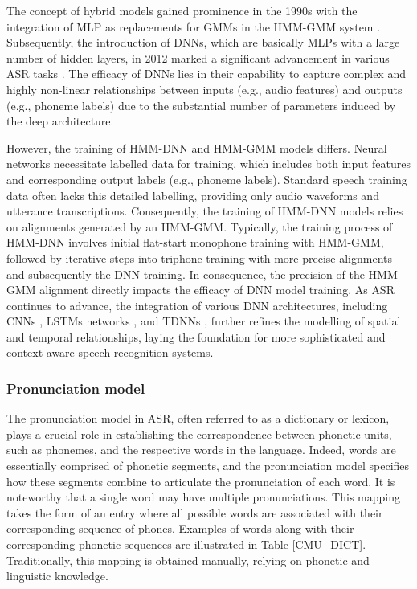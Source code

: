 The concept of hybrid models gained prominence in the 1990s with the integration of \ac{MLP} as replacements for \acp{GMM} in the \ac{HMM-GMM} system \cite{bourlard2012connectionist,meinedo2003audimus}. Subsequently, the introduction of \acp{DNN}, which are basically \acp{MLP} with a large number of hidden layers, in 2012 marked a significant advancement in various \ac{ASR} tasks \cite{hmm-dnn}. The efficacy of \acp{DNN} lies in their capability to capture complex and highly non-linear relationships between inputs (e.g., audio features) and outputs (e.g., phoneme labels) due to the substantial number of parameters induced by the deep architecture.

However, the training of \ac{HMM-DNN} and \ac{HMM-GMM} models differs. Neural networks necessitate labelled data for training, which includes both input features and corresponding output labels (e.g., phoneme labels). Standard speech training data often lacks this detailed labelling, providing only audio waveforms and utterance transcriptions. Consequently, the training of \ac{HMM-DNN} models relies on alignments generated by an \ac{HMM-GMM}. Typically, the training process of \ac{HMM-DNN} involves initial flat-start monophone training with \ac{HMM-GMM}, followed by iterative steps into triphone training with more precise alignments and subsequently the \ac{DNN} training. In consequence, the precision of the \ac{HMM-GMM} alignment directly impacts the efficacy of \ac{DNN} model training. As \ac{ASR} continues to advance, the integration of various \ac{DNN} architectures, including \acp{CNN} \cite{lang1990time}, \acp{LSTM} networks \cite{sak2014long}, and \acp{TDNN} \cite{waibel2013phoneme}, further refines the modelling of spatial and temporal relationships, laying the foundation for more sophisticated and context-aware speech recognition systems.

\subsubsection{Pronunciation model} %
The pronunciation model in \ac{ASR}, often referred to as a dictionary or lexicon, plays a crucial role in establishing the correspondence between phonetic units, such as phonemes, and the respective words in the language. Indeed, words are essentially comprised of phonetic segments, and the pronunciation model specifies how these segments combine to articulate the pronunciation of each word. It is noteworthy that a single word may have multiple pronunciations. This mapping takes the form of an entry where all possible words are associated with their corresponding sequence of phones. Examples of words along with their corresponding phonetic sequences are illustrated in Table \ref{CMU_DICT}. Traditionally, this mapping is obtained manually, relying on phonetic and linguistic knowledge. 


